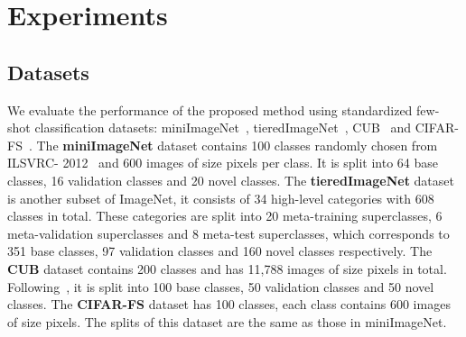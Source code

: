 \documentclass[twoside]{article}
\begin{document}
\section{Experiments}
\label{experiments}
\subsection{Datasets}

We evaluate the performance of the proposed method using standardized few-shot classification datasets: miniImageNet~\cite{vinyals2016matching}, tieredImageNet~\cite{ren2018meta}, CUB~\cite{wah2011caltech} and CIFAR-FS~\cite{bertinetto2018meta}. The \textbf{miniImageNet} dataset contains 100 classes randomly chosen from ILSVRC-
2012~\cite{russakovsky2015imagenet} and 600 images of size  pixels per class. It is split into 64 base classes, 16 validation classes and 20 novel classes. The \textbf{tieredImageNet} dataset is another subset of ImageNet, it consists of 34 high-level categories with 608 classes in total. These categories are split into 20 meta-training superclasses, 6 meta-validation superclasses and 8 meta-test superclasses, which corresponds to 351 base classes, 97 validation classes and 160 novel classes respectively. The \textbf{CUB} dataset contains 200 classes and has 11,788 images of size  pixels in total. Following~\cite{hu2020exploiting}, it is split into 100 base classes, 50 validation classes and 50 novel classes. The \textbf{CIFAR-FS} dataset has 100 classes, each class contains 600 images of size  pixels. The splits of this dataset are the same as those in miniImageNet.
\end{document}
